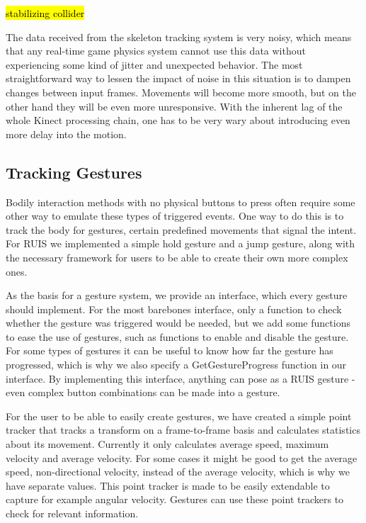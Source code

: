 \documentclass[12pt,a4paper,oneside,pdftex]{report}
\begin{document}
\hl{stabilizing collider}

The data received from the skeleton tracking system is very noisy, which means that any real-time game physics system cannot use this data without experiencing some kind of jitter and unexpected behavior. The most straightforward way to lessen the impact of noise in this situation is to dampen changes between input frames. Movements will become more smooth, but on the other hand they will be even more unresponsive. With the inherent lag of the whole Kinect processing chain, one has to be very wary about introducing even more delay into the motion.

\subsection{Tracking Gestures}
\label{subsection:skeletontracking:gestures}

Bodily interaction methods with no physical buttons to press often require some other way to emulate these types of triggered events. One way to do this is to track the body for gestures, certain predefined movements that signal the intent. For RUIS we implemented a simple hold gesture and a jump gesture, along with the necessary framework for users to be able to create their own more complex ones.

As the basis for a gesture system, we provide an interface, which every gesture should implement. For the most barebones interface, only a function to check whether the gesture was triggered would be needed, but we add some functions to ease the use of gestures, such as functions to enable and disable the gesture. For some types of gestures it can be useful to know how far the gesture has progressed, which is why we also specify a GetGestureProgress function in our interface. By implementing this interface, anything can pose as a RUIS gesture - even complex button combinations can be made into a gesture. 

For the user to be able to easily create gestures, we have created a simple point tracker that tracks a transform on a frame-to-frame basis and calculates statistics about its movement. Currently it only calculates average speed, maximum velocity and average velocity. For some cases it might be good to get the average speed, non-directional velocity, instead of the average velocity, which is why we have separate values. This point tracker is made to be easily extendable to capture for example angular velocity. Gestures can use these point trackers to check for relevant information.
\end{document}
